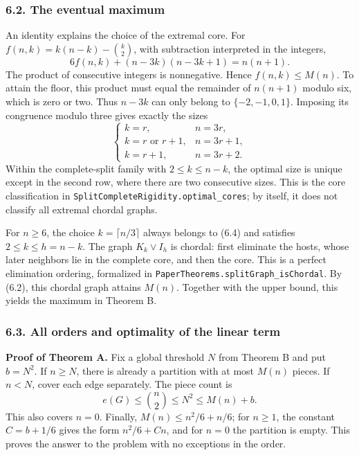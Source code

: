 \documentclass[english,11pt,a4paper]{article}
\begin{document}
\subsubsection{6.2. The eventual maximum}\label{the-eventual-maximum}

An identity explains the choice of the extremal core. For \(f(n,k)=k(n-k)-\binom k2\), with subtraction interpreted in the integers, \[
6f(n,k)+(n-3k)(n-3k+1)=n(n+1).
\tag{6.3}
\] The product of consecutive integers is nonnegative. Hence \(f(n,k)\le M(n)\). To attain the floor, this product must equal the remainder of \(n(n+1)\) modulo six, which is zero or two. Thus \(n-3k\) can only belong to \(\{-2,-1,0,1\}\). Imposing its congruence modulo three gives exactly the sizes \[
\begin{cases}
k=r,& n=3r,\\
k=r\text{ or }r+1,& n=3r+1,\\
k=r+1,& n=3r+2.
\end{cases}
\tag{6.4}
\] Within the complete-split family with \(2\le k\le n-k\), the optimal size is unique except in the second row, where there are two consecutive sizes. This is the core classification in \nolinkurl{SplitCompleteRigidity.optimal_cores}; by itself, it does not classify all extremal chordal graphs.

For \(n\ge6\), the choice \(k=\lceil n/3\rceil\) always belongs to (6.4) and satisfies \(2\le k\le h=n-k\). The graph \(K_k\vee I_h\) is chordal: first eliminate the hosts, whose later neighbors lie in the complete core, and then the core. This is a perfect elimination ordering, formalized in \nolinkurl{PaperTheorems.splitGraph_isChordal}. By (6.2), this chordal graph attains \(M(n)\). Together with the upper bound, this yields the maximum in Theorem B.

\subsubsection{6.3. All orders and optimality of the linear term}\label{all-orders-and-optimality-of-the-linear-term}

\textbf{Proof of Theorem A.} Fix a global threshold \(N\) from Theorem B and put \(b=N^2\). If \(n\ge N\), there is already a partition with at most \(M(n)\) pieces. If \(n<N\), cover each edge separately. The piece count is \[
e(G)\le\binom n2\le N^2\le M(n)+b.
\] This also covers \(n=0\). Finally, \(M(n)\le n^2/6+n/6\); for \(n\ge1\), the constant \(C=b+1/6\) gives the form \(n^2/6+Cn\), and for \(n=0\) the partition is empty. This proves the answer to the problem with no exceptions in the order.
\end{document}
